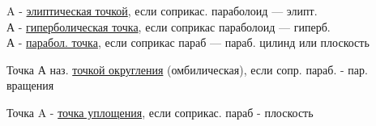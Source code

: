 \documentclass[main]{subfiles}
\begin{document}
    \begin{definition}
        A - \ul{элиптическая точкой}, если соприкас. параболоид --- элипт.\\
        А - \ul{гиперболическая точка}, если соприкас параболоид --- гиперб.\\
        А - \ul{парабол. точка}, если соприкас параб --- параб. цилинд или плоскость
    \end{definition}

    \begin{definition}
        Точка А наз. \ul{точкой округления} (омбилическая), если сопр. параб. - пар. вращения
    \end{definition}

    \begin{definition}
        Точка A - \ul{точка уплощения}, если соприкас. параб - плоскость
    \end{definition}
\end{document}

